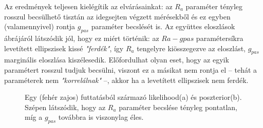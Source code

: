 Az eredmények teljesen kielégítik az elvárásainkat: az $R_a$ paraméter tényleg rosszul becsülhető tisztán az idegsejten végzett mérésekből és ez egyben (valamennyivel) rontja $g_{pas}$ paraméter becslését is. Az együttes eloszlások ábrájáról látszódik jól, hogy ez miért történik: az $Ra-gpas$ paramétersíkra levetített ellipszisek kissé \textit{"ferdék"}, így $R_a$ tengelyre kiösszegezve az eloszlást, $g_{pas}$ marginális eloszlása kiszélesedik. Előfordulhat olyan eset, hogy az egyik paramétert rosszul tudjuk becsülni, viszont ez a másikat nem rontja el -- tehát a paraméterek nem \textit{"korrelálnak"} --, akkor ha a levetített ellipszisek nem ferdék.


\begin{figure}[h!]
	\centering
	\caption[\textit{Stick and ball}, két paraméter, fehér zaj együttes eloszlásai]{Egy (fehér zajos) futtatásból származó likelihood(a) és poszterior(b). Szépen látszódik, hogy az $R_a$ paraméter becslése tényleg pontatlan, míg a $g_{pas}$ továbbra is viszonylag éles.}
	\label{fig:wn3_joint}
\end{figure}



